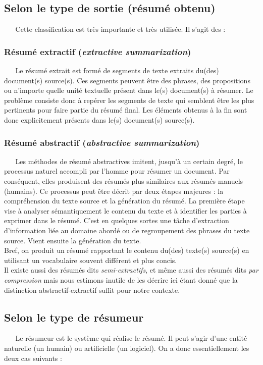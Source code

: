 \subsection{Selon le type de sortie (résumé obtenu)}
$ _{} $ $ _{} $ $ _{} $ $ _{} $ $ _{} $Cette classification est très importante et très utilisée. Il s'agit des :
\subsubsection{Résumé extractif (\textit{extractive summarization})}
$ _{} $ $ _{} $ $ _{} $ $ _{} $ $ _{} $Le résumé extrait est formé de segments de texte extraits du(des) document(s) source(s). Ces segments peuvent être des phrases, des propositions ou n'importe quelle unité textuelle présent dans le(s) document(s) à résumer. Le problème consiste donc à repérer les segments de texte qui semblent être les plus pertinents pour faire partie du résumé final. Les éléments obtenus à la fin sont donc explicitement présents dans le(s) document(s) source(s).
\subsubsection{Résumé abstractif (\textit{abstractive summarization})}
$ _{} $ $ _{} $ $ _{} $ $ _{} $ $ _{} $Les méthodes de résumé abstractives imitent, jusqu'à un certain degré, le processus naturel accompli par l'homme pour résumer un document. Par conséquent, elles produisent des résumés plus similaires aux résumés manuels (humains). Ce processus peut être décrit par deux étapes majeures : la compréhension du texte source et la génération du résumé. La première étape vise à analyser sé\-man\-ti\-que\-ment le contenu du texte et à identifier les parties à exprimer dans le résumé. C'est en quelques sortes une tâche d'extraction d'information liée au domaine abordé ou de regroupement des phrases du texte source. Vient ensuite la génération du texte.\\
Bref, on produit un résumé rapportant le contenu du(des) texte(s) source(s) en utilisant un vocabulaire souvent différent et plus concis.\\

Il existe aussi des résumés dits \textit{semi-extractifs}, et même aussi des résumés dits \textit{par compression} \cite{torres2014automatic} mais nous estimons inutile de les décrire ici étant donné que la distinction abstractif-extractif suffit pour notre contexte.
\subsection{Selon le type de résumeur}
$ _{} $ $ _{} $ $ _{} $ $ _{} $ $ _{} $Le résumeur est le système qui réalise le résumé. Il peut s'agir d'une entité naturelle (un humain) ou artificielle (un logiciel). On a donc es\-sen\-tiel\-lement les deux cas suivants :
